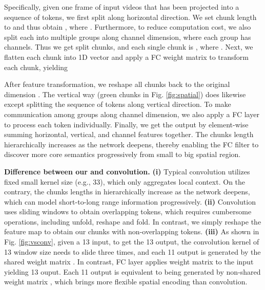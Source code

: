 \documentclass[runningheads]{llncs}
\begin{document}
Specifically, given one frame of input videos  that has been projected into a sequence of tokens, we first split  along horizontal direction. We set chunk length to  and thus obtain  , where . Furthermore, to reduce computation cost, we also split each   into multiple groups along channel dimension, where each group has  channels.
Thus we get split chunks,
and each single chunk is  , where .
Next, we flatten each chunk into 1D vector and apply a  FC weight matrix  to transform each chunk, yielding

After feature transformation, we reshape all chunks   back to the original dimension . The vertical way (green chunks in Fig.  \ref{fig:spatial}) does likewise except splitting the sequence of tokens along vertical direction.  To make communication among groups along channel dimension, we also apply a FC layer to process each token individually.   Finally, we get the output by element-wise summing horizontal, vertical, and channel features together. The chunks length  hierarchically increases as the network deepens, thereby enabling the FC filter to discover more core semantics progressively from small to big spatial region.





\noindent 
\textbf{Difference between our  and convolution.}  \textbf{(i)} Typical convolution utilizes fixed small kernel size (e.g., 33), which only aggregates local context. On the contrary, the chunks lengths in   hierarchically  increase as the network deepens, which can model short-to-long range information progressively.
\textbf{(ii)} Convolution uses sliding windows to obtain overlapping tokens, which requires
cumbersome operations, including unfold, reshape and fold.  
In contrast, we simply reshape the feature map to obtain our chunks with non-overlapping tokens. 
\textbf{(iii)} As shown in Fig.  \ref{fig:vsconv}, given a 13 input, to get the 13 output,  the convolution kernel of 13 window size needs to slide three times, and each 11 output is generated by the shared weight matrix . In contrast, FC layer applies weight matrix  to the input yielding 13 ouput. Each 11 output  is equivalent to being generated by non-shared weight matrix , which brings more flexible spatial encoding than convolution.  
\end{document}
